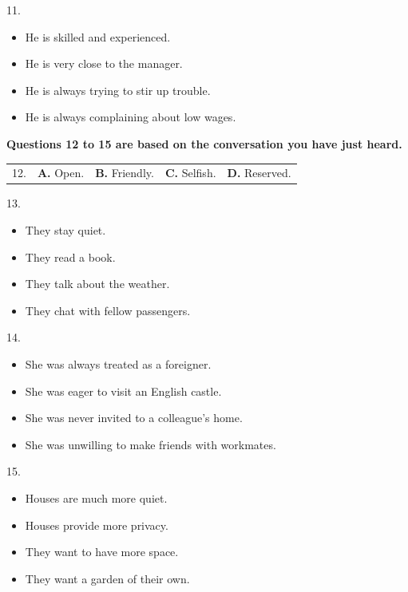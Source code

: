 \documentclass[UTF8,11pt]{ctexart}
\begin{document}
11.


\begin{itemize}[leftmargin=2em,itemsep=.2em,topsep=.4em]\item[A.] He is skilled and experienced.
\item[B.] He is very close to the manager.
\item[C.] He is always trying to stir up trouble.
\item[D.] He is always complaining about low wages.
\end{itemize}

\textbf{Questions 12 to 15 are based on the conversation you have just heard.}


\noindent\begin{tabularx}{\linewidth}{@{}lXXXX@{}}12. & \textbf{A.} Open. & \textbf{B.} Friendly. & \textbf{C.} Selfish. & \textbf{D.} Reserved.\\\end{tabularx}\par

13.


\begin{itemize}[leftmargin=2em,itemsep=.2em,topsep=.4em]\item[A.] They stay quiet.
\item[B.] They read a book.
\item[C.] They talk about the weather.
\item[D.] They chat with fellow passengers.
\end{itemize}

14.


\begin{itemize}[leftmargin=2em,itemsep=.2em,topsep=.4em]\item[A.] She was always treated as a foreigner.
\item[B.] She was eager to visit an English castle.
\item[C.] She was never invited to a colleague's home.
\item[D.] She was unwilling to make friends with workmates.
\end{itemize}

15.


\begin{itemize}[leftmargin=2em,itemsep=.2em,topsep=.4em]\item[A.] Houses are much more quiet.
\item[B.] Houses provide more privacy.
\item[C.] They want to have more space.
\item[D.] They want a garden of their own.
\end{itemize}
\end{document}
